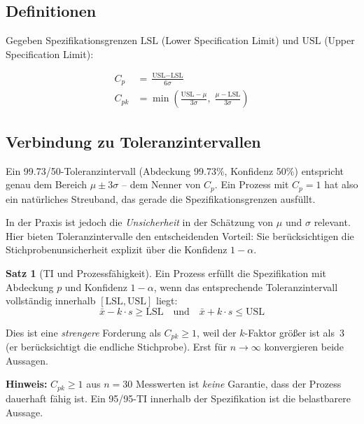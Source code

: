 \documentclass[10pt,a4paper,twocolumn]{article}
\theoremstyle{definition}
\newtheorem{satz}[definition]{Satz}
\newcommand{\hinweis}[1]{%
    \begin{center}
    \colorbox{noteblue}{\parbox{0.92\linewidth}{\small\textbf{Hinweis:} #1}}
    \end{center}
}
\newcommand{\TI}{Toleranzintervall}
\newcommand{\xbar}{\bar{x}}
\begin{document}
\subsection{Definitionen}

Gegeben Spezifikationsgrenzen $\text{LSL}$ (Lower Specification Limit)
und $\text{USL}$ (Upper Specification Limit):

\begin{align}
    C_p &= \frac{\text{USL} - \text{LSL}}{6\sigma}
    \label{eq:cp} \\[4pt]
    C_{pk} &= \min\!\left(
        \frac{\text{USL} - \mu}{3\sigma},\;
        \frac{\mu - \text{LSL}}{3\sigma}
    \right)
    \label{eq:cpk}
\end{align}

\subsection{Verbindung zu Toleranzintervallen}

Ein 99.73/50-\TI{} (Abdeckung 99.73\%, Konfidenz 50\%)
entspricht genau dem Bereich $\mu \pm 3\sigma$ -- dem
Nenner von $C_p$. Ein Prozess mit $C_p = 1$ hat also ein
natürliches Streuband, das gerade die Spezifikationsgrenzen
ausfüllt.

In der Praxis ist jedoch die \emph{Unsicherheit} in der Schätzung
von $\mu$ und $\sigma$ relevant. Hier bieten Toleranzintervalle
den entscheidenden Vorteil: Sie berücksichtigen die
Stichprobenunsicherheit explizit über die Konfidenz $1-\alpha$.

\begin{satz}[TI und Prozessfähigkeit]
Ein Prozess erfüllt die Spezifikation mit Abdeckung $p$ und
Konfidenz $1-\alpha$, wenn das entsprechende \TI{} vollständig
innerhalb $[\text{LSL}, \text{USL}]$ liegt:
\begin{equation}
    \xbar - k \cdot s \geq \text{LSL}
    \quad\text{und}\quad
    \xbar + k \cdot s \leq \text{USL}
    \label{eq:ti_spec}
\end{equation}
\end{satz}

Dies ist eine \emph{strengere} Forderung als $C_{pk} \geq 1$,
weil der $k$-Faktor größer ist als~3 (er berücksichtigt die
endliche Stichprobe). Erst für $n \to \infty$ konvergieren
beide Aussagen.

\hinweis{$C_{pk} \geq 1$ aus $n = 30$ Messwerten ist
\emph{keine} Garantie, dass der Prozess dauerhaft fähig ist.
Ein 95/95-TI innerhalb der Spezifikation ist die belastbarere
Aussage.}
\end{document}
